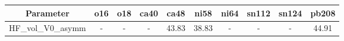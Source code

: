 \begin{tabular}{|c||c||c||c||c||c||c||c||c||c|} 
 \hline 
\bf{Parameter}& \bf{o16}& \bf{o18}& \bf{ca40}& \bf{ca48}& \bf{ni58}& \bf{ni64}& \bf{sn112}& \bf{sn124}& \bf{pb208}\\
 \hline
 \hline 
HF\_vol\_V0\_asymm & - & - & - & 43.83 & 38.83 & - & - & - & 44.91\\

 \hline 
\end{tabular}